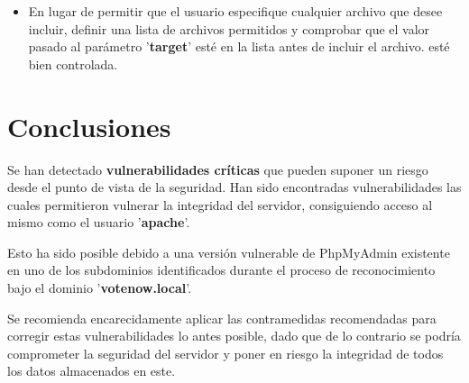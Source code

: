 \documentclass[a4paper]{article} %
\begin{document}
   \begin{itemize} 
    \item En lugar de permitir que el usuario especifique cualquier archivo que desee incluir, definir una lista de archivos
      permitidos y comprobar que el valor pasado al parámetro '\textbf{target}' esté en la lista antes de incluir el archivo. 
      esté bien controlada. 
    \end{itemize}

  \clearpage
  \section{Conclusiones}

  Se han detectado \textbf{vulnerabilidades críticas} que pueden suponer un riesgo desde el punto de vista de la seguridad. Han sido encontradas vulnerabilidades las cuales permitieron vulnerar la integridad del servidor, consiguiendo acceso al mismo como el usuario '\textbf{apache}'.

  Esto ha sido posible debido a una versión vulnerable de PhpMyAdmin existente en uno de los subdominios identificados durante el proceso de reconocimiento bajo el dominio 
  '\textbf{votenow.local}'. 

  Se recomienda encarecidamente aplicar las contramedidas recomendadas para corregir estas vulnerabilidades lo antes posible, dado que de lo contrario se podría comprometer 
  la seguridad del servidor y poner en riesgo la integridad de todos los datos almacenados en este. 
\end{document}
